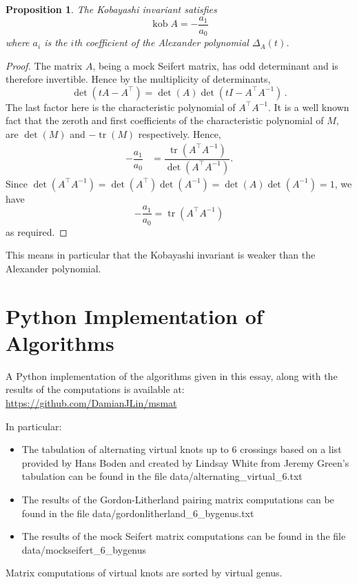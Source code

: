 \documentclass[12pt]{report}
\newcommand{\kob}{\operatorname{kob}}
\newtheorem*{proposition}{Proposition}
\theoremstyle{upright}
\begin{document}
\begin{proposition}
The Kobayashi invariant satisfies
\[\kob A = -\dfrac{a_{1}}{a_{0}}\]
where $a_{i}$ is the $i$th coefficient of the Alexander polynomial $\Delta_{A}(t)$.
\end{proposition}
\begin{proof}
The matrix $A$, being a mock Seifert matrix, has odd determinant \cite{mock-seifert-matrices} and is therefore invertible. Hence by the multiplicity of determinants,
\[\det(tA - A^{\top}) = \det(A)\det(tI - A^{\top}A^{-1})\,.\]
The last factor here is the characteristic polynomial of $A^{\top}A^{-1}$. It is a well known fact that the zeroth and first coefficients of the characteristic polynomial of $M$, are $\det(M)$ and $-\operatorname{tr}(M)$ respectively. Hence,
\begin{align*}
-\dfrac{a_{1}}{a_{0}}	& = \dfrac{\operatorname{tr}(A^{\top}A^{-1})}{\det(A^{\top}A^{-1})}.
\end{align*}
Since $\det(A^{\top}A^{-1}) = \det(A^{\top})\det(A^{-1}) = \det(A)\det(A^{-1}) = 1$, we have
\[-\dfrac{a_{1}}{a_{0}} = \operatorname{tr}(A^{\top}A^{-1})\]
as required.
\end{proof}

This means in particular that the Kobayashi invariant is weaker than the Alexander polynomial.


\newpage
\printbibliography[title=References]


\appendix
{}
\titlespacing*{\chapter}{0pt}{40pt}{30pt}

\chapter{Python Implementation of Algorithms}

A Python implementation of the algorithms given in this essay, along with the results of the computations is available at: \\ \url{https://github.com/DamianJLin/msmat}

In particular:
\begin{itemize}
	\item The tabulation of alternating virtual knots up to $6$ crossings based on a list provided by Hans Boden and created by Lindsay White from Jeremy Green's tabulation \cite{virtual-knot-table} can be found in the file {\ttfamily data/alternating\_virtual\_6.txt}
	\item The results of the Gordon-Litherland pairing matrix computations can be found in the file {\ttfamily data/gordonlitherland\_6\_bygenus.txt}
	\item The results of the mock Seifert matrix computations can be found in the file\\ {\ttfamily data/mockseifert\_6\_bygenus}
\end{itemize}

Matrix computations of virtual knots are sorted by virtual genus.
\end{document}
